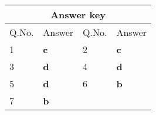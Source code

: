 \setlength\arrayrulewidth{1pt}
\begin{table}[H]
	\centering
	
	\begin{tabular}{|p{1.5cm}|p{1.5cm}||p{1.5cm}|p{1.5cm}|}
		\hline
		\multicolumn{4}{|c|}{\textbf{Answer key}}\\\hline\hline
		\rowcolor{ocrel}Q.No.&Answer&Q.No.&Answer\\\hline
		1&\textbf{c}&2&\textbf{c}\\\hline
		3&\textbf{d}&4&\textbf{d}\\\hline
		5&\textbf{d}&6&\textbf{b}\\\hline
		7&\textbf{b}&&\\\hline
	\end{tabular}
\end{table}

